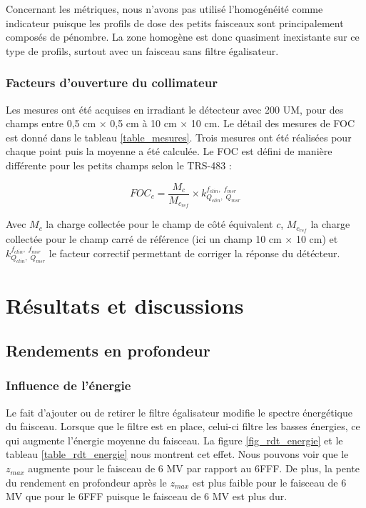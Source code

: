 \documentclass{article}
\begin{document}
Concernant les métriques, nous n'avons pas utilisé l'homogénéité comme indicateur puisque les profils de dose des petits faisceaux sont principalement composés de pénombre. La zone homogène est donc quasiment inexistante sur ce type de profils, surtout avec un faisceau sans filtre égalisateur.

\subsubsection{Facteurs d'ouverture du collimateur}

Les mesures ont été acquises en irradiant le détecteur avec 200 UM, pour des champs entre 0,5 cm $\times$ 0,5 cm à 10 cm $\times$ 10 cm. Le détail des mesures de FOC est donné dans le tableau \ref*{table_mesures}. Trois mesures ont été réalisées pour chaque point puis la moyenne a été calculée. Le FOC est défini de manière différente pour les petits champs selon le TRS-483 \cite{TRS483} : 

\begin{equation}
  FOC_c = \dfrac{M_c}{M_{c_{ref}}} \times k_{Q_{clin}, \; Q_{msr}}^{f_{clin}, \; f_{msr}}
\end{equation}

Avec $M_c$ la charge collectée pour le champ de côté équivalent $c$, $M_{c_{ref}}$ la charge collectée pour le champ carré de référence (ici un champ 10 cm $\times$ 10 cm) et $k_{Q_{clin}, \; Q_{msr}}^{f_{clin}, \; f_{msr}}$ le facteur correctif permettant de corriger la réponse du détécteur.

\section{Résultats et discussions}
\subsection{Rendements en profondeur}
\subsubsection{Influence de l'énergie}

Le fait d'ajouter ou de retirer le filtre égalisateur modifie le spectre énergétique du faisceau. Lorsque que le filtre est en place, celui-ci filtre les basses énergies, ce qui augmente l'énergie moyenne du faisceau. La figure \ref*{fig_rdt_energie} et le tableau \ref*{table_rdt_energie} nous montrent cet effet. Nous pouvons voir que le $z_{max}$ augmente pour le faisceau de 6 MV par rapport au 6FFF. De plus, la pente du rendement en profondeur après le $z_{max}$ est plus faible pour le faisceau de 6 MV que pour le 6FFF puisque le faisceau de 6 MV est plus dur.
\end{document}
